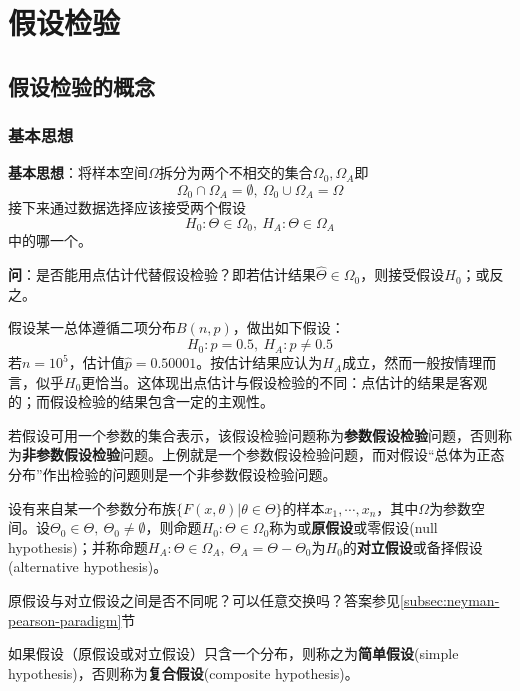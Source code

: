 \chapter{假设检验}

\section{假设检验的概念}

\subsection{基本思想}

\textbf{基本思想}：将样本空间$\Omega$拆分为两个不相交的集合$\Omega_0, \Omega_A$即
\[ \Omega_0 \cap \Omega_A=\emptyset,\ \Omega_0 \cup \Omega_A=\Omega \]
接下来通过数据选择应该接受两个假设
\[ H_0:\Theta \in \Omega_0,\ H_A:\Theta \in \Omega_A \]
中的哪一个。

\textbf{问}：是否能用点估计代替假设检验？即若估计结果$\hat{\Theta} \in \Omega_0$，则接受假设$H_0$；或反之。

假设某一总体遵循二项分布$B(n,p)$，做出如下假设：
\[ H_0:p=0.5,\ H_A : p \neq 0.5 \]
若$n=10^5$，估计值$\hat{p}=0.50001$。按估计结果应认为$H_A$成立，然而一般按情理而言，似乎$H_0$更恰当。这体现出点估计与假设检验的不同：点估计的结果是客观的；而假设检验的结果包含一定的主观性。

若假设可用一个参数的集合表示，该假设检验问题称为\textbf{参数假设检验}问题，否则称为\textbf{非参数假设检验}问题。上例就是一个参数假设检验问题，而对假设“总体为正态分布”作出检验的问题则是一个非参数假设检验问题。

\begin{definition}[原假设与对立假设]
    设有来自某一个参数分布族$\{ F(x,\theta) | \theta \in \Theta \}$的样本$x_1,\cdots ,x_n$，其中$\Omega$为参数空间。设$\Theta_0 \in \Theta,\ \Theta_0 \neq \emptyset$，则命题$ H_0:\Theta \in \Omega_0$称为或\textbf{原假设}或零假设(null hypothesis)；并称命题$H_A:\Theta \in \Omega_A,\ \Theta_A=\Theta-\Theta_0$为$H_0$的\textbf{对立假设}或备择假设(alternative hypothesis)。
\end{definition}
\begin{remark}
    原假设与对立假设之间是否不同呢？可以任意交换吗？答案参见\ref{subsec:neyman-pearson-paradigm}节
\end{remark}

\begin{definition}
    如果假设（原假设或对立假设）只含一个分布，则称之为\textbf{简单假设}(simple hypothesis)，否则称为\textbf{复合假设}(composite hypothesis)。
\end{definition}


